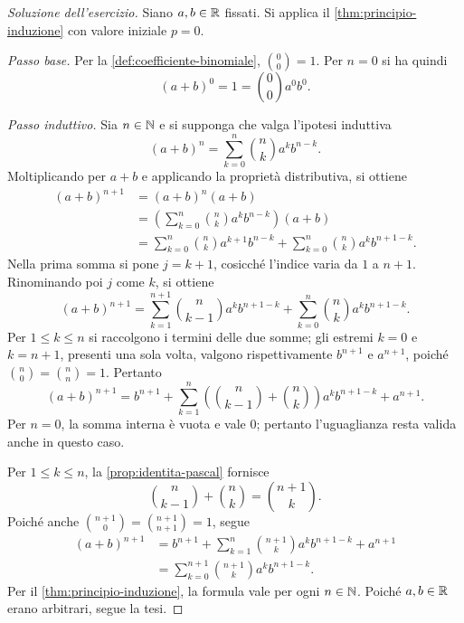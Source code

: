 \begin{proof}[Soluzione dell'esercizio]
Siano \(a,b\in\mathbb{R}\) fissati. Si applica il
\cref{thm:principio-induzione} con valore iniziale \(p=0\).

\emph{Passo base.}
Per la \cref{def:coefficiente-binomiale}, \(\binom{0}{0}=1\).
Per \(n=0\) si ha quindi
\[
  (a+b)^0=1=\binom{0}{0}a^0b^0.
\]

\emph{Passo induttivo.}
Sia \(n\in\mathbb{N}\) e si supponga che valga l'ipotesi induttiva
\[
  (a+b)^n=\sum_{k=0}^{n}\binom{n}{k}a^k b^{n-k}.
\]
Moltiplicando per \(a+b\) e applicando la proprietà distributiva,
si ottiene
\begin{align*}
  (a+b)^{n+1}
    &=(a+b)^n(a+b)\\
    &=\left(\sum_{k=0}^{n}\binom{n}{k}a^k b^{n-k}\right)(a+b)\\
    &=\sum_{k=0}^{n}\binom{n}{k}a^{k+1}b^{n-k}
      +\sum_{k=0}^{n}\binom{n}{k}a^k b^{n+1-k}.
\end{align*}
Nella prima somma si pone \(j=k+1\), cosicché l'indice varia
da \(1\) a \(n+1\). Rinominando poi \(j\) come \(k\), si ottiene
\[
  (a+b)^{n+1}
  =\sum_{k=1}^{n+1}\binom{n}{k-1}a^k b^{n+1-k}
    +\sum_{k=0}^{n}\binom{n}{k}a^k b^{n+1-k}.
\]
Per \(1\le k\le n\) si raccolgono i termini delle due somme;
gli estremi \(k=0\) e \(k=n+1\), presenti una sola volta, valgono
rispettivamente \(b^{n+1}\) e \(a^{n+1}\), poiché
\(\binom{n}{0}=\binom{n}{n}=1\). Pertanto
\[
  (a+b)^{n+1}
  =b^{n+1}
    +\sum_{k=1}^{n}
      \left(\binom{n}{k-1}+\binom{n}{k}\right)a^k b^{n+1-k}
    +a^{n+1}.
\]
Per \(n=0\), la somma interna è vuota e vale \(0\); pertanto
l'uguaglianza resta valida anche in questo caso.

Per \(1\le k\le n\), la \cref{prop:identita-pascal} fornisce
\[
  \binom{n}{k-1}+\binom{n}{k}=\binom{n+1}{k}.
\]
Poiché anche \(\binom{n+1}{0}=\binom{n+1}{n+1}=1\), segue
\begin{align*}
  (a+b)^{n+1}
    &=b^{n+1}+\sum_{k=1}^{n}\binom{n+1}{k}a^k b^{n+1-k}
      +a^{n+1}\\
    &=\sum_{k=0}^{n+1}\binom{n+1}{k}a^k b^{n+1-k}.
\end{align*}
Per il \cref{thm:principio-induzione}, la formula vale per
ogni \(n\in\mathbb{N}\). Poiché \(a,b\in\mathbb{R}\) erano arbitrari, segue la tesi.
\end{proof}
